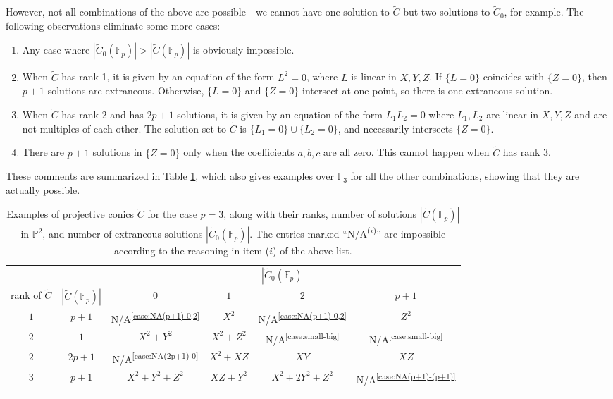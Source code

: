\documentclass[10pt,a4paper]{amsart}
\numberwithin{equation}{section}
\numberwithin{figure}{section}
\numberwithin{table}{section}
\theoremstyle{definition}
\theoremstyle{plain}
\theoremstyle{remark}
\theoremstyle{plain}
\theoremstyle{definition}
\theoremstyle{plain}
\theoremstyle{plain}
\renewcommand{\P}{\mathbb{P}}
\newcommand{\F}{\mathbb{F}}
\begin{document}
	However, not all combinations of the above are possible---we cannot have one solution to $\widetilde{C}$ but two solutions to $\widetilde{C}_0$, for example. The following observations eliminate some more cases:
	\begin{enumerate}
		\item\label{case:small-big} Any case where $|\widetilde{C}_0(\F_p)| > |\widetilde{C}(\F_p)|$ is obviously impossible.
		\item\label{case:NA(p+1)-0,2} When $\widetilde{C}$ has rank 1, it is given by an equation of the form $L^2 = 0$, where $L$ is linear in $X,Y,Z$. If $\{L=0\}$ coincides with $\{Z = 0\}$, then $p+1$ solutions are extraneous. Otherwise, $\{L=0\}$ and $\{Z=0\}$ intersect at one point, so there is one extraneous solution.
		\item\label{case:NA(2p+1)-0} When $\widetilde{C}$ has rank 2 and has $2p + 1$ solutions, it
		is given by an equation of the form $L_1 L_2 = 0$ where $L_1,L_2$ are linear in $X,Y,Z$ and are not multiples of each other. The solution set to $\widetilde{C}$ is $\{L_1 = 0\}\cup\{L_2 = 0\}$, and necessarily intersects $\{Z = 0\}$.
		\item\label{case:NA(p+1)-(p+1)} There are $p+1$ solutions in $\{Z = 0\}$ only when the 
		coefficients $a,b,c$ are all zero. This cannot happen when $\widetilde{C}$ has rank 3.
	\end{enumerate}
	These comments are summarized in Table \ref{table:all-possibilities}, which also gives examples over $\F_3$ for all the other combinations, showing that they are actually possible.
	
	\begin{table}[h]
		\begin{tabular}{cccccc}
          \toprule
 \multicolumn{2}{c}{} &
			\multicolumn{4}{c}{$|\widetilde{C}_0(\F_p)|$}  \\\cmidrule(r){3-6}
			rank of $\widetilde{C}$ & $|\widetilde{C}(\F_p)|$ & $0$ & $1$ & $2$ & $p + 1$\\
			\midrule
			$1$ & \multicolumn{1}{c|}{$p+1$} & N/A\textsuperscript{\eqref{case:NA(p+1)-0,2}} & $X^2$ & N/A\textsuperscript{\eqref{case:NA(p+1)-0,2}} & $Z^2$ \\
			$2$ & \multicolumn{1}{c|}{$1$} & $X^2 + Y^2$ & $X^2 + Z^2$ & N/A\textsuperscript{\eqref{case:small-big}} & N/A\textsuperscript{\eqref{case:small-big}} \\
			$2$ &	\multicolumn{1}{c|}{$2p+1$} & N/A\textsuperscript{\eqref{case:NA(2p+1)-0}} & $X^2 + XZ$ & $XY$ & $XZ$ \\
			$3$ & \multicolumn{1}{c|}{$p+1$} & $X^2 + Y^2 + Z^2$ & $XZ+Y^2$ & $X^2 + 2Y^2 + Z^2$ & N/A\textsuperscript{\eqref{case:NA(p+1)-(p+1)}} \\
			\bottomrule
			\multicolumn{2}{c}{}
		\end{tabular}
		\caption{Examples of projective conics $\widetilde{C}$ for the case $p=3$, along with their ranks, number of solutions $|\widetilde{C}(\F_p)|$ in $\P^2$, and number of extraneous solutions $|\widetilde{C}_0(\F_p)|$. The entries marked ``N/A\textsuperscript{($i$)}'' are impossible according to the reasoning in item ($i$) of the above list.}\label{table:all-possibilities}
	\end{table}
	
\end{document}
